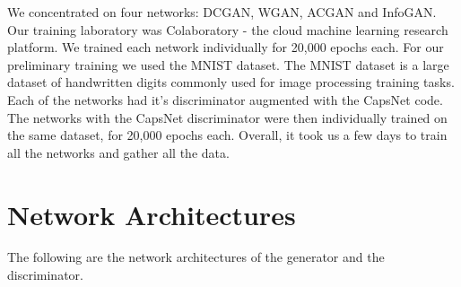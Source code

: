We concentrated on four networks: DCGAN, WGAN, ACGAN and InfoGAN. Our training laboratory was Colaboratory - the cloud machine learning research platform. We trained each network individually for 20,000 epochs each. For our preliminary training we used the MNIST dataset. The MNIST dataset is a large dataset of handwritten digits commonly used for image processing training tasks. Each of the networks had it's discriminator augmented with the CapsNet code. The networks with the CapsNet discriminator were then individually trained on the same dataset, for 20,000 epochs each. Overall, it took us a few days to train all the networks and gather all the data.
\par\bigskip

\section{Network Architectures} %
\label{sec:network_architectures}
The following are the network architectures of the generator and the discriminator.

